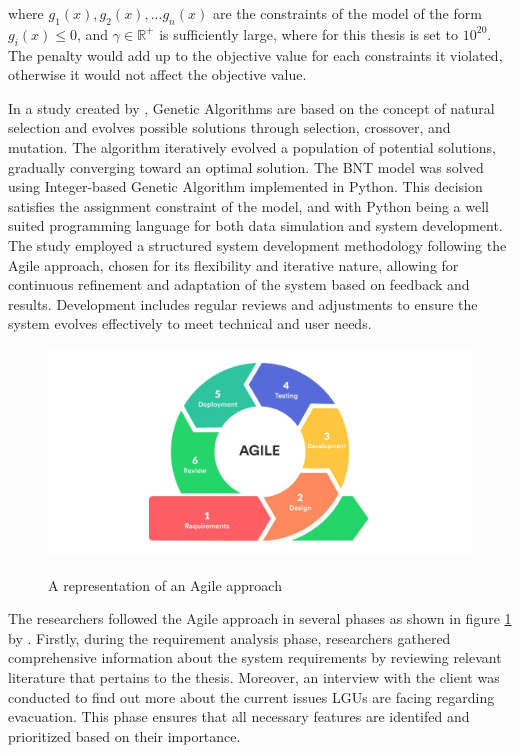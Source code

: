 \documentclass[12pt,a4paper,]{article}
\begin{document}
	where $g_1(x),g_2(x),...g_n(x)$ are the constraints of the model of the form $g_i(x)\le0$, and $\gamma\in\mathbb{R}^+$ is sufficiently large, where for this thesis is set to $10^{20}$. The penalty would add up to the objective value for each constraints it violated, otherwise it would not affect the objective value.	
	
	In a study created by \textcite{Mathew2012}, Genetic Algorithms are based on the concept of natural selection and evolves possible solutions through selection, crossover, and mutation. The algorithm iteratively evolved a population of potential solutions, gradually converging toward an optimal solution.
	The BNT model was solved using Integer-based Genetic Algorithm implemented in Python. This decision satisfies the assignment constraint of the model, and with Python being a well suited programming language for both data simulation and system development.
	The study employed a structured system development methodology following the Agile approach, chosen for its flexibility and iterative nature, allowing for continuous refinement and adaptation of the system based on feedback and results. Development includes regular reviews and adjustments to ensure the system evolves effectively to meet technical and user needs. 
	
	\begin{figure}[h!]
		\caption{A representation of an Agile approach}
		\centering
		\includegraphics[width=\columnwidth]{AGILE}
		\label{Agile}
	\end{figure}
	
	The researchers followed the Agile approach in several phases as shown in figure \ref{Agile} by \textcite{Jayathilaka2020}. Firstly, during the requirement analysis phase, researchers gathered comprehensive information about the system requirements by reviewing relevant literature that pertains to the thesis. Moreover, an interview with the client was conducted to find out more about the current issues LGUs are facing regarding evacuation. This phase ensures that all necessary features are identifed and prioritized based on their importance.
	
\end{document}

